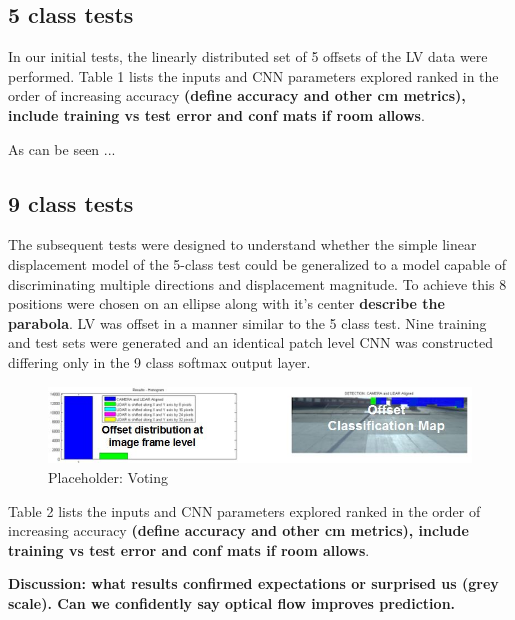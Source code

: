 \documentclass{article}
\begin{document}
\subsection{5 class tests} %
\label{sub:5_class_tests}
In our initial tests, the linearly distributed set of 5 offsets of the LV data were performed. Table 1 lists the inputs and CNN parameters explored ranked in the order of increasing accuracy \textbf{(define accuracy and other cm metrics), include training vs test error and conf mats if room allows}.  

As can be seen ... 


\subsection{9 class tests} %
\label{sub:9_class_tests}
The subsequent tests were designed to understand whether the simple linear displacement model of the 5-class test could be generalized to a model capable of discriminating multiple directions and displacement magnitude. To achieve this 8 positions were chosen on an ellipse along with it's center \textbf{describe the parabola}. LV was offset in a manner similar to the 5 class test. Nine training and test sets were generated and an identical patch level CNN was constructed differing only in the 9 class softmax output layer. 

\begin{figure}[htbp]
    \centering
        \includegraphics[scale=0.85]{Figures/Voting_5class.jpg}
    \caption{Placeholder: Voting}
    \label{fig:Figures_Voting}
\end{figure}

Table 2 lists the inputs and CNN parameters explored ranked in the order of increasing accuracy \textbf{(define accuracy and other cm metrics), include training vs test error and conf mats if room allows}.  

 \textbf{Discussion: what results confirmed expectations or surprised us (grey scale). Can we confidently say optical flow improves prediction. }
\end{document}
